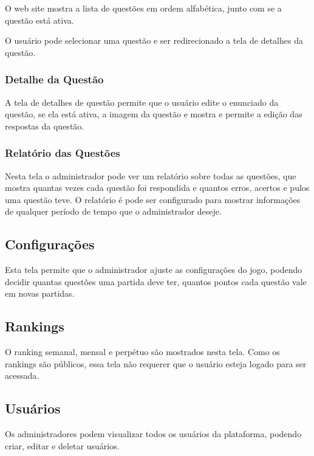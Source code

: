 O web site  mostra a lista de questões em ordem alfabética, junto com se a questão está ativa.
    
O usuário pode selecionar uma questão e ser redirecionado a tela de detalhes da questão.


\subsubsection{Detalhe da Questão}
\label{subsubsec:detalhequestao}

A tela de detalhes de questão permite que o usuário edite o enunciado da questão, se ela está ativa, a imagem da questão e mostra e permite a edição das respostas da questão.


\subsubsection{Relatório das Questões}
\label{subsubsec:relatorioquestoes}

Nesta tela o administrador pode ver um relatório sobre todas as questões, que mostra quantas vezes cada questão foi respondida e quantos erros, acertos e pulos uma questão teve. O relatório é pode ser configurado para mostrar informações de  qualquer período de tempo que o administrador deseje.

\subsection{Configurações}
\label{subsec:configreact}

Esta tela permite que o administrador ajuste as configurações do jogo, podendo decidir quantas questões uma partida deve ter, quantos pontos cada questão vale em novas partidas.

\subsection{Rankings}
\label{subsec:rankingsreact}

O ranking semanal, mensal e perpétuo são mostrados nesta tela. Como os rankings são públicos, essa tela não requerer que o usuário esteja logado para ser acessada.

\subsection{Usuários}
\label{subsec:usuariosreact}

Os administradores podem visualizar todos os usuários da plataforma, podendo criar, editar e deletar usuários.